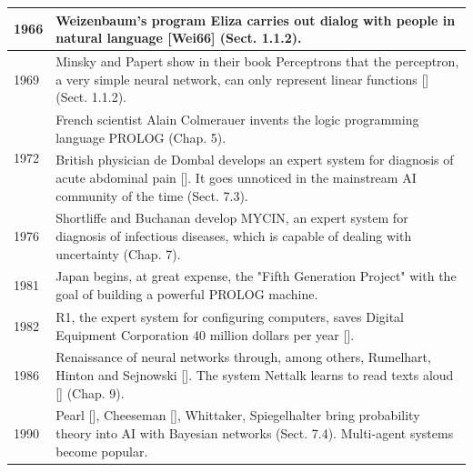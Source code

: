 \documentclass[10pt]{book}
\begin{document}
\begin{center}
\begin{tabular}{|l|l|}
\hline
1966 & Weizenbaum's program Eliza carries out dialog with people in natural language [Wei66] (Sect. 1.1.2). \\
\hline
1969 & Minsky and Papert show in their book Perceptrons that the perceptron, a very simple neural network, can only represent linear functions [\cite{minsky1969perceptrons}] (Sect. 1.1.2). \\
\hline
\multirow[t]{2}{*}{1972} & French scientist Alain Colmerauer invents the logic programming language PROLOG (Chap. 5). \\
\hline
 & British physician de Dombal develops an expert system for diagnosis of acute abdominal pain [\cite{dedombal1972computer}]. It goes unnoticed in the mainstream AI community of the time (Sect. 7.3). \\
\hline
1976 & Shortliffe and Buchanan develop MYCIN, an expert system for diagnosis of infectious diseases, which is capable of dealing with uncertainty (Chap. 7). \\
\hline
1981 & Japan begins, at great expense, the "Fifth Generation Project" with the goal of building a powerful PROLOG machine. \\
\hline
1982 & R1, the expert system for configuring computers, saves Digital Equipment Corporation 40 million dollars per year [\cite{mcdermott1982r1}]. \\
\hline
1986 & Renaissance of neural networks through, among others, Rumelhart, Hinton and Sejnowski [\cite{rumelhart1986pdp}]. The system Nettalk learns to read texts aloud [\cite{sejnowski1986nettalk}] (Chap. 9). \\
\hline
1990 & Pearl [\cite{pearl1988probabilistic}], Cheeseman [\cite{cheeseman1985defense}], Whittaker, Spiegelhalter bring probability theory into AI with Bayesian networks (Sect. 7.4). Multi-agent systems become popular. \\
\hline
\end{tabular}
\end{center}
\end{document}
